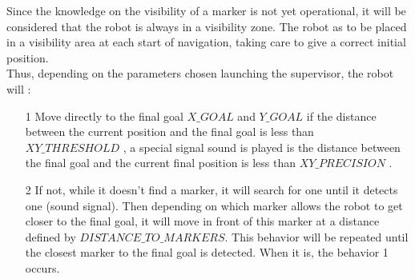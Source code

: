 \documentclass[10pt,a4paper]{article}
\begin{document}
Since the knowledge on the visibility of a marker is not yet operational, it will be considered that the robot is always in a visibility zone. The robot as to be placed in a visibility area at each start of navigation, taking care to give a correct initial position.\\

Thus, depending on the parameters chosen launching the supervisor, the robot will :

\begin{itemize}
\item[1] Move directly to the final goal $X\_GOAL$ and $Y\_GOAL$ if the distance between the current position and the final goal is less than  $XY\_THRESHOLD$ , a special signal sound is played is the distance between the final goal and the current final position is less than   $XY\_PRECISION$ .
\item[2] If not, while it doesn't find a marker, it will search for one until it detects one (sound signal). Then depending on which marker allows the robot to get closer to the final goal, it will move in front of this marker at a distance defined by $DISTANCE\_TO\_MARKERS$. This behavior will be repeated until the closest marker to the final goal is detected. When it is, the behavior 1 occurs.
\end{itemize}
\end{document}
